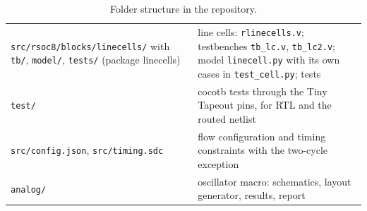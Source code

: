 \documentclass[10pt,a4paper]{article}
\begin{document}
\begin{table}[H]
\begin{tabularx}{\linewidth}{@{}lL@{}}
\texttt{src/rsoc8/blocks/linecells/} with \texttt{tb/}, \texttt{model/}, \texttt{tests/} (package linecells) & line cells: \texttt{rlinecells.v}; testbenches \texttt{tb\_lc.v}, \texttt{tb\_lc2.v}; model \texttt{linecell.py} with its own cases in \texttt{test\_cell.py}; tests \\
\texttt{test/} & cocotb tests through the Tiny Tapeout pins, for RTL and the routed netlist \\
\texttt{src/config.json}, \texttt{src/timing.sdc} & flow configuration and timing constraints with the two-cycle exception \\
\texttt{analog/} & oscillator macro: schematics, layout generator, results, report \\
\bottomrule
\end{tabularx}
\caption{Folder structure in the repository.}
\end{table}
\end{document}
